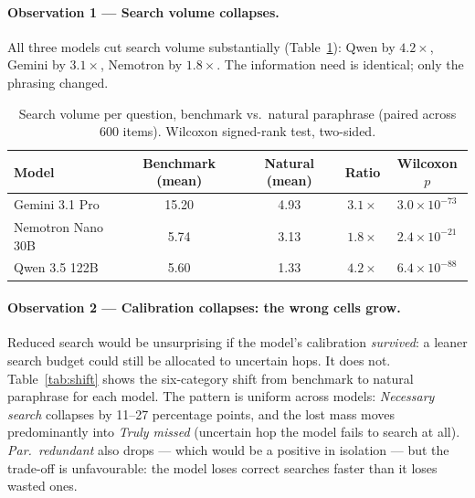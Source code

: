 \documentclass[10pt,letterpaper]{article}
\begin{document}
\paragraph{Observation 1 --- Search volume collapses.}
All three models cut search volume substantially (Table~\ref{tab:volume}): Qwen by
$4.2\times$, Gemini by $3.1\times$, Nemotron by $1.8\times$. The information need is
identical; only the phrasing changed.

\begin{table}[ht]
\centering
\small
\caption{Search volume per question, benchmark vs.\ natural paraphrase (paired across
600 items). Wilcoxon signed-rank test, two-sided.}
\label{tab:volume}
\begin{tabular}{lcccc}
\toprule
\textbf{Model} & \textbf{Benchmark (mean)} & \textbf{Natural (mean)} & \textbf{Ratio} & \textbf{Wilcoxon $p$} \\
\midrule
Gemini 3.1 Pro       & 15.20 & 4.93 & $3.1\times$ & $3.0\!\times\!10^{-73}$ \\
Nemotron Nano 30B  &  5.74 & 3.13 & $1.8\times$ & $2.4\!\times\!10^{-21}$ \\
Qwen 3.5 122B      &  5.60 & 1.33 & $4.2\times$ & $6.4\!\times\!10^{-88}$ \\
\bottomrule
\end{tabular}
\end{table}

\paragraph{Observation 2 --- Calibration collapses: the wrong cells grow.}
Reduced search would be unsurprising if the model's calibration \emph{survived}: a leaner
search budget could still be allocated to uncertain hops. It does not.
Table~\ref{tab:shift} shows the six-category shift from benchmark to natural paraphrase
for each model. The pattern is uniform across models: \emph{Necessary search}
collapses by 11--27 percentage points, and the lost mass moves predominantly into
\emph{Truly missed} (uncertain hop the model fails to search at all). \emph{Par.\
redundant} also drops --- which would be a positive in isolation --- but the trade-off is
unfavourable: the model loses correct searches faster than it loses wasted ones.
\end{document}
